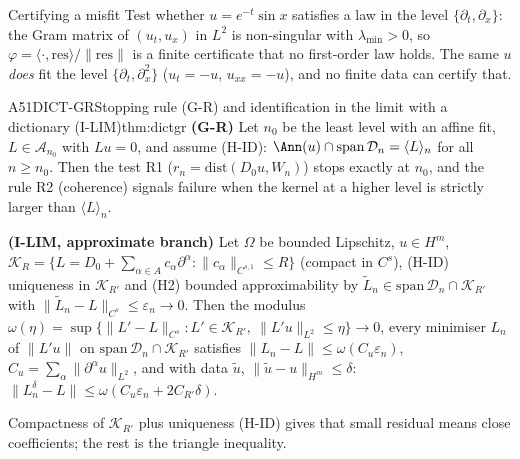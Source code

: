 \begin{example}{Certifying a misfit}
Test whether $u=e^{-t}\sin x$ satisfies a law in the level $\{\partial_t,\partial_x\}$: the Gram matrix of $(u_t,u_x)$ in $L^2$ is non-singular with $\lambda_{\min}>0$, so $\varphi=\langle\cdot,\mathrm{res}\rangle/\|\mathrm{res}\|$ is a finite certificate that no first-order law holds. The same $u$ \emph{does} fit the level $\{\partial_t,\partial_x^2\}$ ($u_t=-u$, $u_{xx}=-u$), and no finite data can certify that.
\end{example}

\begin{dimcard}{A51}{DICT-GR}{Stopping rule (G-R) and identification in the limit with a dictionary (I-LIM)}{\proved}{thm:dictgr}
\textbf{(G-R)} Let $n_0$ be the least level with an affine fit, $L\in\mathcal A_{n_0}$ with $Lu=0$, and assume (H-ID): $\Ann(u)\cap\mathrm{span}\,\mathcal D_n=\langle L\rangle_n$ for all $n\ge n_0$. Then the test R1 ($r_n=\mathrm{dist}(D_0u,W_n)$) stops exactly at $n_0$, and the rule R2 (coherence) signals failure when the kernel at a higher level is strictly larger than $\langle L\rangle_n$.

\textbf{(I-LIM, approximate branch)} Let $\Omega$ be bounded Lipschitz, $u\in H^m$, $\mathcal K_R=\{L=D_0+\sum_{\alpha\in A}c_\alpha\partial^\alpha:\|c_\alpha\|_{C^{s,1}}\le R\}$ (compact in $C^s$), (H-ID) uniqueness in $\mathcal K_{R'}$ and (H2) bounded approximability by $\tilde L_n\in\mathrm{span}\,\mathcal D_n\cap\mathcal K_{R'}$ with $\|\tilde L_n-L\|_{C^s}\le\varepsilon_n\to0$. Then the modulus $\omega(\eta)=\sup\{\|L'-L\|_{C^s}:L'\in\mathcal K_{R'},\ \|L'u\|_{L^2}\le\eta\}\to0$, every minimiser $L_n$ of $\|L'u\|$ on $\mathrm{span}\,\mathcal D_n\cap\mathcal K_{R'}$ satisfies $\|L_n-L\|\le\omega(C_u\varepsilon_n)$, $C_u=\sum_\alpha\|\partial^\alpha u\|_{L^2}$, and with data $\tilde u$, $\|\tilde u-u\|_{H^m}\le\delta$: $\|L_n^\delta-L\|\le\omega(C_u\varepsilon_n+2C_{R'}\delta)$.
\end{dimcard}

\begin{proofidea}
Compactness of $\mathcal K_{R'}$ plus uniqueness (H-ID) gives that small residual means close coefficients; the rest is the triangle inequality.
\end{proofidea}


